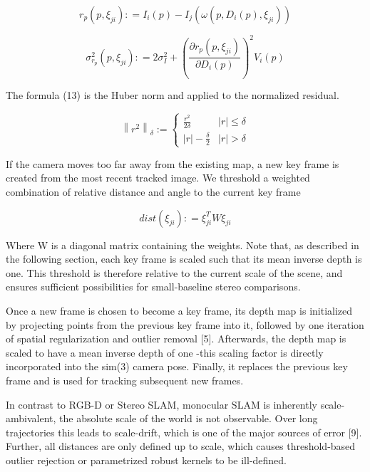 \begin{equation}
r_{p}(p,\xi _{ji}): = I_{i}(p) - I_{j}(\omega (p,D_{i}(p),\xi _{ji}))
\end{equation}

\begin{equation}
\sigma _{r_{p}} ^{2}(p,\xi _{ji}): = 2\sigma _{I} ^{2} + {\left( \frac {\partial r_{p}(p,\xi_{ji})} {\partial D_{i} (p)} \right)^{2}} V_{i}(p)
\end{equation}

The formula (13) is the Huber norm and applied to the normalized residual.

\begin{equation}
{\left\| r^{2} \right\|_{\delta}}:=\left\{\begin{array}{ll}
\frac {r^{2}} {2\delta}            & |r|\leq \delta       \\
|r|-\frac {\delta} {2}      & |r| > \delta
\end{array} \right.
\end{equation}




If the camera moves too far away from the existing map, a new key frame is created from the most recent tracked image. We threshold a weighted combination of relative distance and angle to the current key frame

\begin{equation}
dist({\xi _{ji}}): = \xi _{ji}^TW{\xi _{ji}}
\end{equation}

Where W is a diagonal matrix containing the weights. Note that, as described in the following section, each key frame is scaled such that its mean inverse depth is one. This threshold is therefore relative to the current scale of the scene, and ensures sufficient possibilities for small-baseline stereo comparisons.

Once a new frame is chosen to become a key frame, its depth map is initialized by projecting points from the previous key frame into it, followed by one iteration of spatial regularization and outlier removal [5]. Afterwards, the depth map is scaled to have a mean inverse depth of one -this scaling factor is directly incorporated into the sim(3) camera pose. Finally, it replaces the previous key frame and is used for tracking subsequent new frames.

In contrast to RGB-D or Stereo SLAM, monocular SLAM is inherently scale-ambivalent, the absolute scale of the world is not observable. Over long trajectories this leads to scale-drift, which is one of the major sources of error [9]. Further, all distances are only defined up to scale, which causes threshold-based outlier rejection or parametrized robust kernels to be ill-defined.

